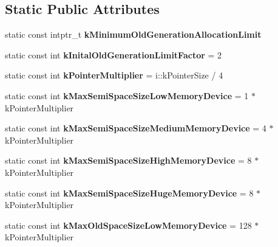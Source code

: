 \subsection*{Static Public Attributes}
\begin{DoxyCompactItemize}
\item 
static const intptr\+\_\+t {\bfseries k\+Minimum\+Old\+Generation\+Allocation\+Limit}
\item 
static const int {\bfseries k\+Inital\+Old\+Generation\+Limit\+Factor} = 2\hypertarget{classv8_1_1internal_1_1_heap_a283b1320088df8b32025b51589c15be0}{}\label{classv8_1_1internal_1_1_heap_a283b1320088df8b32025b51589c15be0}

\item 
static const int {\bfseries k\+Pointer\+Multiplier} = i\+::k\+Pointer\+Size / 4\hypertarget{classv8_1_1internal_1_1_heap_ad066a03f343d821140af2c59eb65dd0c}{}\label{classv8_1_1internal_1_1_heap_ad066a03f343d821140af2c59eb65dd0c}

\item 
static const int {\bfseries k\+Max\+Semi\+Space\+Size\+Low\+Memory\+Device} = 1 $\ast$ k\+Pointer\+Multiplier\hypertarget{classv8_1_1internal_1_1_heap_aebd4f958868b06008a8ee2df3b74d65e}{}\label{classv8_1_1internal_1_1_heap_aebd4f958868b06008a8ee2df3b74d65e}

\item 
static const int {\bfseries k\+Max\+Semi\+Space\+Size\+Medium\+Memory\+Device} = 4 $\ast$ k\+Pointer\+Multiplier\hypertarget{classv8_1_1internal_1_1_heap_adc196f3cf0358ace35c1395e6f0492b3}{}\label{classv8_1_1internal_1_1_heap_adc196f3cf0358ace35c1395e6f0492b3}

\item 
static const int {\bfseries k\+Max\+Semi\+Space\+Size\+High\+Memory\+Device} = 8 $\ast$ k\+Pointer\+Multiplier\hypertarget{classv8_1_1internal_1_1_heap_a0dd775738069e831a03275abddceb71b}{}\label{classv8_1_1internal_1_1_heap_a0dd775738069e831a03275abddceb71b}

\item 
static const int {\bfseries k\+Max\+Semi\+Space\+Size\+Huge\+Memory\+Device} = 8 $\ast$ k\+Pointer\+Multiplier\hypertarget{classv8_1_1internal_1_1_heap_ad3873deaa64241d40d0170816e2046ab}{}\label{classv8_1_1internal_1_1_heap_ad3873deaa64241d40d0170816e2046ab}

\item 
static const int {\bfseries k\+Max\+Old\+Space\+Size\+Low\+Memory\+Device} = 128 $\ast$ k\+Pointer\+Multiplier\hypertarget{classv8_1_1internal_1_1_heap_ad3853d76b1848e87a335c3b3f01b7190}{}\label{classv8_1_1internal_1_1_heap_ad3853d76b1848e87a335c3b3f01b7190}


\end{DoxyCompactItemize}
